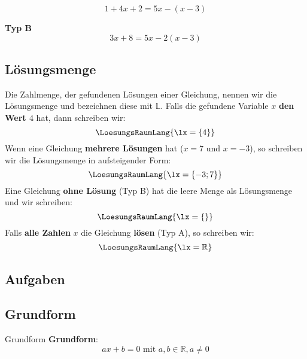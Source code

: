 $$1+4x+2 = 5x - (x-3)$$

\textbf{Typ B}\\

$$3x+8 = 5x-2(x-3)$$


\subsection{Lösungsmenge}
  Die Zahlmenge, der gefundenen Lösungen einer Gleichung, nennen wir
  die Lösungsmenge und bezeichnen diese mit $\mathbb{L}$. Falls die gefundene
  Variable $x$ \zB{} \textbf{den Wert $4$} hat, dann schreiben wir:
  $$\LoesungsRaumLang{\lx=\{4\}}$$
  Wenn eine Gleichung \textbf{mehrere Lösungen} hat (\zB $x=7$ und $x=-3$), so
  schreiben wir die Lösungsmenge in aufsteigender Form:
  $$\LoesungsRaumLang{\lx=\{-3; 7\}}$$
  Eine Gleichung \textbf{ohne Lösung} (Typ B) hat die leere Menge als Lösungsmenge und
  wir schreiben:
  $$\LoesungsRaumLang{\lx=\{\}}$$
  Falls \textbf{alle Zahlen} $x$ die Gleichung \textbf{lösen} (Typ A), so schreiben wir:
  $$\LoesungsRaumLang{\lx=\mathbb{R}}$$

  

\subsection*{Aufgaben}


\newpage


\subsection{Grundform}
\begin{definition}{Grundform}{}
  \textbf{Grundform}:\\
  $$ax+b=0 \text{ mit } a,b\in\mathbb{R}, a\ne 0$$
  
  \end{definition}

